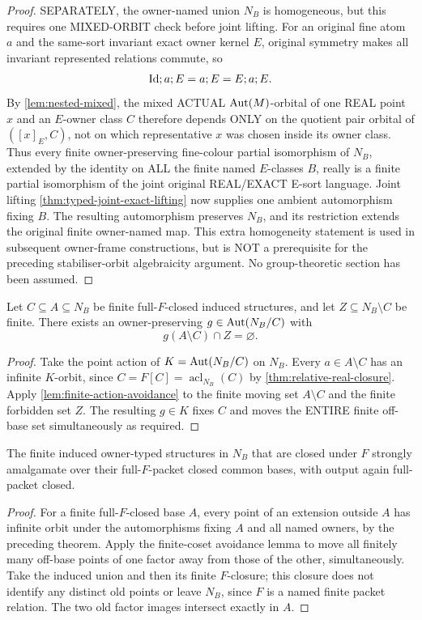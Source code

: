 \begin{proof}
SEPARATELY, the owner-named union $N_B$
is homogeneous, but this requires one
MIXED-ORBIT check before joint lifting.
For an original fine atom $a$ and the
same-sort invariant exact owner kernel
$E$, original symmetry makes all
invariant represented relations commute,
so
\[
              \mathrm{Id};a;E=a;E=E;a;E .
\]
By \cref{lem:nested-mixed}, the mixed
ACTUAL $\operatorname{Aut}(M)$-orbital of one REAL
point $x$ and an $E$-owner class $C$
therefore depends ONLY on the quotient
pair orbital of $([x]_E,C)$, not on
which representative $x$ was chosen
inside its owner class. Thus every
finite owner-preserving fine-colour
partial isomorphism of $N_B$,
extended by the identity on ALL
the finite named $E$-classes $B$,
really is a finite partial
isomorphism of the joint
original REAL/EXACT E-sort language.
Joint lifting
\cref{thm:typed-joint-exact-lifting}
now supplies one ambient
automorphism fixing $B$.
The resulting automorphism preserves
$N_B$, and its restriction extends the
original finite owner-named map.
This extra homogeneity statement is used
in subsequent owner-frame constructions,
but is NOT a prerequisite for the preceding
stabiliser-orbit algebraicity argument.
No group-theoretic section has been assumed.
\end{proof}

\begin{lemma}
\label{lem:relative-finite-avoidance}
Let $C\subseteq A\subseteq N_B$ be finite full-$F$-closed
induced structures, and let $Z\subseteq N_B\setminus C$ be finite.
There exists an owner-preserving $g\in\operatorname{Aut}(N_B/C)$ with
\[
                   g(A\setminus C)\cap Z=\varnothing.
\]
\end{lemma}
\begin{proof}
Take the point action of $K=\operatorname{Aut}(N_B/C)$ on $N_B$.
Every $a\in A\setminus C$ has an infinite $K$-orbit,
since $C=F[C]=\operatorname{acl}_{N_B}(C)$ by
\cref{thm:relative-real-closure}.  Apply
\cref{lem:finite-action-avoidance} to the finite moving
set $A\setminus C$ and the finite forbidden set $Z$.
The resulting $g\in K$ fixes $C$ and moves the ENTIRE
finite off-base set simultaneously as required.
\end{proof}

\begin{corollary}
\label{cor:relative-closed-sap}
The finite induced owner-typed structures in $N_B$ that
are closed under $F$ strongly amalgamate over their
full-$F$-packet closed common bases, with output again
full-packet closed.
\end{corollary}
\begin{proof}
For a finite full-$F$-closed base $A$, every point of
an extension outside $A$ has infinite orbit under the
automorphisms fixing $A$ and all named owners, by the
preceding theorem.  Apply the finite-coset avoidance
lemma to move all finitely many off-base points of one
factor away from those of the other, simultaneously.
Take the induced union and then its finite $F$-closure;
this closure does not identify any distinct old points or
leave $N_B$, since $F$ is a named finite packet relation.
The two old factor images intersect exactly in $A$.
\end{proof}

